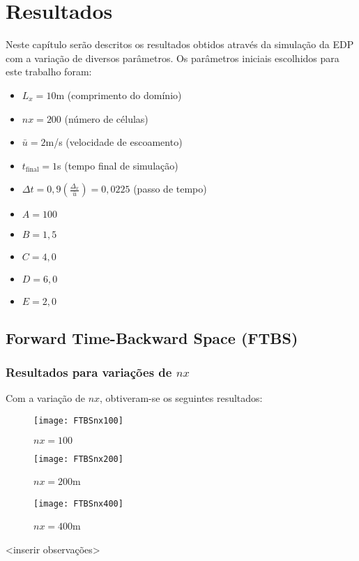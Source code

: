 \chapter{Resultados}
Neste capítulo serão descritos os resultados obtidos através da simulação da
EDP com a variação de diversos parâmetros. Os parâmetros iniciais escolhidos
para este trabalho foram:
\begin{itemize}
    \item $L_x = 10$m (comprimento do domínio)
    \item $nx = 200$ (número de células)
    \item $\bar{u} = 2$m/s (velocidade de escoamento)
    \item $t_\text{final} = 1$s  (tempo final de simulação)
    \item $\Delta t = 0,9\left( \frac{\Delta_x}{\bar{u}} \right) = 0,0225$
    (passo de tempo)
    \item $A = 100$
    \item $B = 1,5$
    \item $C = 4,0$
    \item $D = 6,0$
    \item $E = 2,0$
\end{itemize}

\section{Forward Time-Backward Space (FTBS)}

\subsection{Resultados para variações de $nx$}
Com a variação de $nx$, obtiveram-se os seguintes resultados:
\begin{figure}[H]
    \centering
    \texttt{[image: FTBSnx100]}
    \caption{$nx = 100$}
\end{figure}
\begin{figure}[H]
    \centering
    \texttt{[image: FTBSnx200]}
    \caption{$nx = 200$m}
\end{figure}
\begin{figure}[H]
    \centering
    \texttt{[image: FTBSnx400]}
    \caption{$nx = 400$m}
\end{figure}
<inserir observações>

